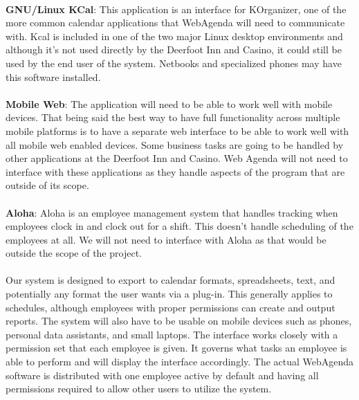 \documentclass[letterpaper,12pt]{report}
\begin{document}
\paragraph*{}\hspace{0.6cm}\textbf{GNU/Linux KCal}: This application is an interface for KOrganizer, one of the more common calendar applications that WebAgenda will need to communicate with. Kcal is included in one of the two major Linux desktop environments and although it’s not used directly by the Deerfoot Inn and Casino, it could still be used by the end user of the system. Netbooks and specialized phones may have this software installed.
\newpage

\paragraph*{}\hspace{0.6cm}\textbf{Mobile Web}: The application will need to be able to work well with mobile devices. That being said the best way to have full functionality across multiple mobile platforms is to have a separate web interface to be able to work well with all mobile web enabled devices. 
Some business tasks are going to be handled by other applications at the Deerfoot Inn and Casino. Web Agenda will not need to interface with these applications as they handle aspects of the program that are outside of its scope.
\paragraph*{}\hspace{0.6cm}\textbf{Aloha}: Aloha is an employee management system that handles tracking when employees clock in and clock out for a shift. This doesn’t handle scheduling of the employees at all. We will not need to interface with Aloha as that would be outside the scope of the project.

\paragraph*{}\hspace{0.6cm}
	Our system is designed to export to calendar formats, spreadsheets, text, and potentially any format the user wants via a plug-in. This generally applies to schedules, although employees with proper permissions can create and output reports. The system will also have to be usable on mobile devices such as phones, personal data assistants, and small laptops. The interface works closely with a permission set that each employee is given. It governs what tasks an employee is able to perform and will display the interface accordingly. The actual WebAgenda software is distributed with one employee active by default and having all permissions required to allow other users to utilize the system.
\end{document}
